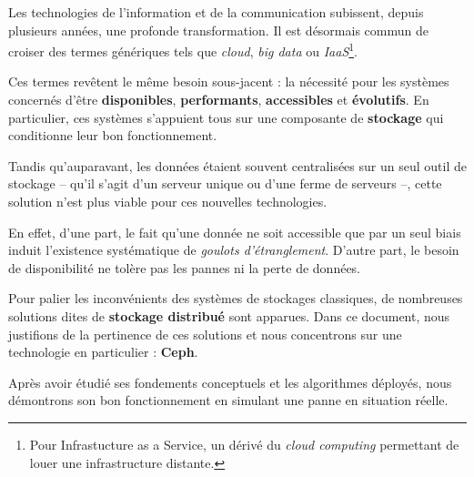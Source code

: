 
Les technologies de l'information et de la communication subissent, depuis plusieurs années, une profonde transformation. Il est désormais commun de croiser des termes génériques tels que \textit{cloud}, \textit{big data} ou \textit{IaaS}\footnote{Pour Infrastucture as a Service, un dérivé du \textit{cloud computing} permettant de louer une infrastructure distante.}.

Ces termes revêtent le même besoin sous-jacent : la nécessité pour les systèmes concernés d'être \textbf{disponibles}, \textbf{performants}, \textbf{accessibles} et \textbf{évolutifs}. En particulier, ces systèmes s'appuient tous sur une composante de \textbf{stockage} qui conditionne leur bon fonctionnement.

Tandis qu'auparavant, les données étaient souvent centralisées sur un seul outil de stockage -- qu'il s'agit d'un serveur unique ou d'une ferme de serveurs --, cette solution n'est plus viable pour ces nouvelles technologies. 

En effet, d'une part, le fait qu'une donnée ne soit accessible que par un seul biais induit l'existence systématique de \textit{goulots d'étranglement}. D'autre part, le besoin de disponibilité ne tolère pas les pannes ni la perte de données.

Pour palier les inconvénients des systèmes de stockages classiques, de nombreuses solutions dites de \textbf{stockage distribué} sont apparues. Dans ce document, nous justifions de la pertinence de ces solutions et nous concentrons sur une technologie en particulier : \textbf{Ceph}.

Après avoir étudié ses fondements conceptuels et les algorithmes déployés, nous démontrons son bon fonctionnement en simulant une panne en situation réelle.